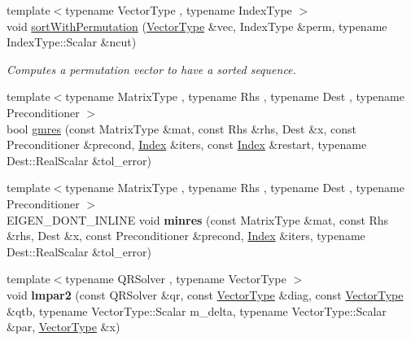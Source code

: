 \begin{DoxyCompactItemize}
\item 
{\footnotesize template$<$typename Vector\+Type , typename Index\+Type $>$ }\\void \hyperlink{namespace_eigen_1_1internal_afe2a11c61eff70f7f68681a557fa21e7}{sort\+With\+Permutation} (\hyperlink{struct_vector_type}{Vector\+Type} \&vec, Index\+Type \&perm, typename Index\+Type\+::\+Scalar \&ncut)
\begin{DoxyCompactList}\small\item\em Computes a permutation vector to have a sorted sequence. \end{DoxyCompactList}\item 
{\footnotesize template$<$typename Matrix\+Type , typename Rhs , typename Dest , typename Preconditioner $>$ }\\bool \hyperlink{namespace_eigen_1_1internal_a851df31ae9133639a8eb3f6a8484bbf7}{gmres} (const Matrix\+Type \&mat, const Rhs \&rhs, Dest \&x, const Preconditioner \&precond, \hyperlink{namespace_eigen_a62e77e0933482dafde8fe197d9a2cfde}{Index} \&iters, const \hyperlink{namespace_eigen_a62e77e0933482dafde8fe197d9a2cfde}{Index} \&restart, typename Dest\+::\+Real\+Scalar \&tol\+\_\+error)
\item 
\mbox{\label{namespace_eigen_1_1internal_afced1fe1b9cc2bdb888c88b61f93c0ca}} 
{\footnotesize template$<$typename Matrix\+Type , typename Rhs , typename Dest , typename Preconditioner $>$ }\\E\+I\+G\+E\+N\+\_\+\+D\+O\+N\+T\+\_\+\+I\+N\+L\+I\+NE void {\bfseries minres} (const Matrix\+Type \&mat, const Rhs \&rhs, Dest \&x, const Preconditioner \&precond, \hyperlink{namespace_eigen_a62e77e0933482dafde8fe197d9a2cfde}{Index} \&iters, typename Dest\+::\+Real\+Scalar \&tol\+\_\+error)
\item 
\mbox{\label{namespace_eigen_1_1internal_aba45e9db6efca39c2cd2ed9ea8911acf}} 
{\footnotesize template$<$typename Q\+R\+Solver , typename Vector\+Type $>$ }\\void {\bfseries lmpar2} (const Q\+R\+Solver \&qr, const \hyperlink{struct_vector_type}{Vector\+Type} \&diag, const \hyperlink{struct_vector_type}{Vector\+Type} \&qtb, typename Vector\+Type\+::\+Scalar m\+\_\+delta, typename Vector\+Type\+::\+Scalar \&par, \hyperlink{struct_vector_type}{Vector\+Type} \&x)
\item 
\mbox{\label{namespace_eigen_1_1internal_ab02b12e1b86ddb7b50855f9ecf000410}} 

\end{DoxyCompactItemize}

